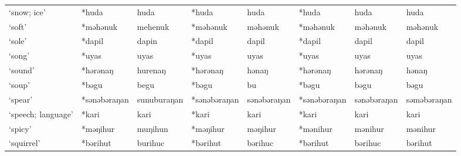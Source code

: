 \begin{landscape}
\begin{longtable}[c]{@{}p{3cm}<{\raggedright}p{2.75cm}<{\raggedright}p{2.75cm}<{\raggedright}p{2.75cm}<{\raggedright}p{2.75cm}<{\raggedright}p{2.75cm}<{\raggedright}p{2.75cm}<{\raggedright}p{2.75cm}<{\raggedright}@{}}
`snow; ice'                                          & *huda        & huda                          & *huda          & huda                       & *huda            & huda                     & huda                              \\
`soft'                                               & *məhənuk     & mehenuk                       & *məhənuk       & məhənuk                    & *məhənuk         & məhənuk                  & məhənuk                           \\
`sole'                                               & *dapil       & dapin                         & *dapil         & dapil                      & *dapil           & dapil                    & dapil                             \\
`song'                                               & *uyas        & uyas                          & *uyas          & uyas                       & *uyas            & uyas                     & uyas                              \\
`sound'                                              & *hərənaŋ     & hurenaŋ                       & *hərənaŋ       & hənaŋ                      & *hərənaŋ         & hərənaŋ                  & hənaŋ                             \\
`soup'                                               & *bəgu        & begu                          & *bəgu          & bu                         & *bəgu            & bəgu                     & bəgu                              \\
`spear'                                              & *sənəbəraŋan & sunuburaŋan                   & *sənəbəraŋan   & sənəbəraŋan                & *sənəbəraŋan     & sənəbəraŋan              & səməbəraŋan                       \\
`speech; language'                                   & *kari        & kari                          & *kari          & kari                       & *kari            & kari                     & kari                              \\
`spicy'                                              & *məŋihur     & muŋihun                       & *məŋihur       & məŋihur                    & *mənihur         & mənihur                  & mənihur                           \\
`squirrel'                                           & *bərihut     & burihuc                       & *bərihut       & bərihuc                    & *bərihut         & bərihuc                  & bərihut                           \\

\end{longtable}
\end{landscape}
